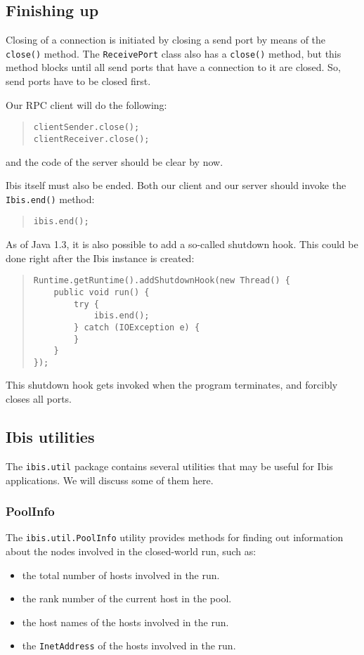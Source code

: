 \documentclass[10pt]{article}
\newcommand{\mysubsection}[1]{\subsection{#1}\label{#1}}
\newcommand{\mysubsubsection}[1]{\subsubsection{#1}\label{#1}}
\begin{document}
\subsection{Finishing up}

Closing of a connection is initiated by closing a send port
by means of the \texttt{close()} method. The \texttt{ReceivePort}
class also has a \texttt{close()} method, but this method blocks
until all send ports that have a connection to it are closed.
So, send ports have to be closed first.

Our RPC client will do the following:

\begin{quote}
\begin{verbatim}
clientSender.close();
clientReceiver.close();
\end{verbatim}
\end{quote}
and the code of the server should be clear by now.

Ibis itself must also be ended. Both our client and our server
should invoke the \texttt{Ibis.end()} method:
\begin{quote}
\begin{verbatim}
ibis.end();
\end{verbatim}
\end{quote}

As of Java 1.3, it is also possible to add a so-called shutdown hook.
This could be done right after the Ibis instance is created:
\begin{quote}
\begin{verbatim}
Runtime.getRuntime().addShutdownHook(new Thread() {
    public void run() {
        try {
            ibis.end();
        } catch (IOException e) {
        }
    }
});
\end{verbatim}
\end{quote}
\noindent
This shutdown hook gets invoked when the program terminates, and
forcibly closes all ports.

\mysubsection{Ibis utilities}

The \texttt{ibis.util} package contains several utilities that may be
useful for Ibis applications. We will discuss some of them here.

\mysubsubsection{PoolInfo}

The \texttt{ibis.util.PoolInfo} utility
provides methods for finding out information about the nodes
involved in the closed-world run, such as:
\begin{itemize}
\item
the total number of hosts involved in the run.
\item
the rank number of the current host in the pool.
\item
the host names of the hosts involved in the run.
\item
the \texttt{InetAddress} of the hosts involved in the run.
\end{itemize}
\end{document}
